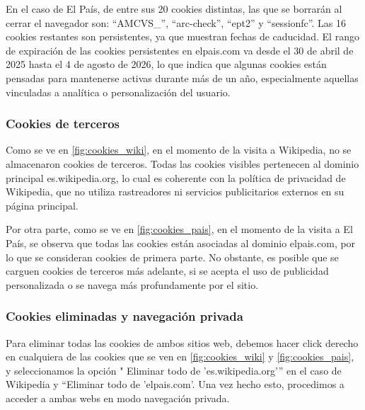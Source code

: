 En el caso de El País, de entre sus 20 cookies distintas, las que se borrarán al cerrar el navegador son: “AMCVS_”, “arc-check”, “ept2” y “sessionfc”. Las 16 cookies restantes son persistentes, ya que muestran fechas de caducidad. El rango de expiración de las cookies persistentes en elpais.com va desde el 30 de abril de 2025 hasta el 4 de agosto de 2026, lo que indica que algunas cookies están pensadas para mantenerse activas durante más de un año, especialmente aquellas vinculadas a analítica o personalización del usuario. 

\subsubsection{Cookies de terceros}

Como se ve en \ref{fig:cookies_wiki}, en el momento de la visita a Wikipedia, no se almacenaron cookies de terceros. Todas las cookies visibles pertenecen al dominio principal es.wikipedia.org, lo cual es coherente con la política de privacidad de Wikipedia, que no utiliza rastreadores ni servicios publicitarios externos en su página principal. 

Por otra parte, como se ve en \ref{fig:cookies_pais}, en el momento de la visita a El País, se observa que todas las cookies están asociadas al dominio elpais.com, por lo que se consideran cookies de primera parte. No obstante, es posible que se carguen cookies de terceros más adelante, si se acepta el uso de publicidad personalizada o se navega más profundamente por el sitio.

\subsubsection{Cookies eliminadas y navegación privada}

Para eliminar todas las cookies de ambos sitios web, debemos hacer click derecho en cualquiera de las cookies que se ven en \ref{fig:cookies_wiki} y \ref{fig:cookies_pais}, y seleccionamos la opción " Eliminar todo de 'es.wikipedia.org'” en el caso de Wikipedia y “Eliminar todo de 'elpais.com'. Una vez hecho esto, procedimos a acceder a ambas webs en modo navegación privada. 

